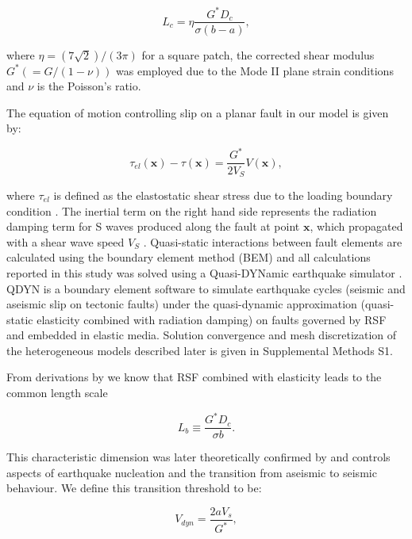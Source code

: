 \documentclass[final,3p, 11pt,authoryear]{elsarticle}
\begin{document}
\begin{equation}
\label{eq8}
L_{c} = \eta \frac{G^{*} D_{c}}{ \sigma \left( b-a\right)},
\end{equation}   

\noindent where $\eta = (7\sqrt{2})/(3\pi)$ \citep{Dieterich1992} for a square patch, the corrected shear modulus $G^{*} (= G/(1-\nu))$ was employed due to the Mode II plane strain conditions and $\nu$ is the Poisson's ratio. 

The equation of motion controlling slip on a planar fault in our model is given by:

\begin{equation}
\label{eq8a}
\tau_{el}\left( \mathbf{x} \right) - \tau\left( \mathbf{x} \right) = \frac{G^{*}}{2 V_{S}} V(\mathbf{x}),
\end{equation}  

\noindent where $\tau_{el}$ is defined as the elastostatic shear stress due to the loading boundary condition \citep{Horowitz1989}. The inertial term on the right hand side represents the radiation damping term for S waves produced along the fault at point $\mathbf{x}$, which propagated with a shear wave speed $V_{S}$ \citep{Rice1993}. Quasi-static interactions between fault elements are calculated using the boundary element method (BEM) and all calculations reported in this study was solved using a Quasi-DYNamic earthquake simulator \citep{Luo2017}. QDYN is a boundary element software to simulate earthquake cycles (seismic and aseismic slip on tectonic faults) under the quasi-dynamic approximation (quasi-static elasticity combined with radiation damping) on faults governed by RSF and embedded in elastic media.  Solution convergence and mesh discretization of the heterogeneous models described later is given in Supplemental Methods S1.

From derivations by \citet{Dieterich1992} we know that RSF combined with elasticity leads to the common length scale

\begin{equation}
\label{eq8b}
L_{b} \equiv \frac{G^{*}D_{c}}{\sigma b}.
\end{equation}  

\noindent This characteristic dimension was later theoretically confirmed by \citet{Rubin2005} and controls aspects of earthquake nucleation and the transition from aseismic to seismic behaviour. We define this transition threshold to be:

\begin{equation}
\label{eq8c}
V_{dyn} = \frac{2 a V_{s}}{G^{*}},
\end{equation}  
\end{document}

